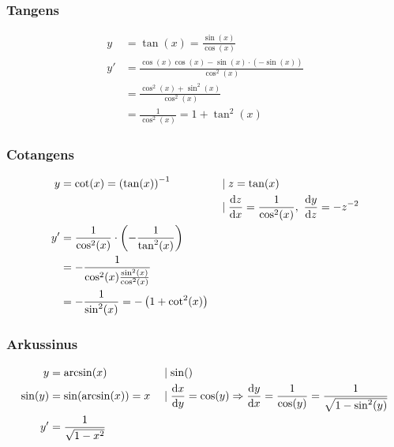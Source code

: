 \subsubsection{Tangens}

\begin{align*}
	y  & = \tan(x) = \frac{\sin(x)}{\cos(x)}                          \\
	y' & = \frac{\cos(x)\cos(x) - \sin(x)\cdot (-\sin(x))}{\cos^2(x)} \\
	   & = \frac{\cos^2(x) + \sin^2(x)}{\cos^2(x)}                    \\
	   & = \frac{1}{\cos^2(x)} = 1 + \tan^2(x)
\end{align*}

\subsubsection{Cotangens}

\begin{align*}
	y  & = \cot(x) = {(\tan(x))}^{-1}                                    &  & \mid z = \tan(x)                                                                       \\
	   &                                                                 &  & \mid \frac{\mathop{}\!\mathrm{d} z}{\mathop{}\!\mathrm{d} x} = \frac{1}{\cos^2(x)},\ \frac{\mathop{}\!\mathrm{d} y}{\mathop{}\!\mathrm{d} z} = -z^{-2} \\
	y' & = \frac{1}{\cos^2(x)} \cdot \left( -\frac{1}{\tan^2(x)} \right)                                                                                             \\
	   & = -\frac{1}{\cos^2(x) \frac{\sin^2(x)}{\cos^2(x)}}                                                                                                          \\
	   & = -\frac{1}{\sin^2(x)} = -\left( 1 + \cot^2(x) \right)
\end{align*}

\subsubsection{Arkussinus}

\begin{align*}
	y       & = \arcsin(x)               &  & \mid \sin()                                                                                                                     \\
	\sin(y) & = \sin(\arcsin(x)) = x     &  & \mid \frac{\mathop{}\!\mathrm{d} x}{\mathop{}\!\mathrm{d} y} = \cos(y) \Rightarrow \frac{\mathop{}\!\mathrm{d} y}{\mathop{}\!\mathrm{d} x} = \frac{1}{\cos(y)} = \frac{1}{\sqrt{1 - \sin^2(y)}} \\
	y'      & = \frac{1}{\sqrt{1 - x^2}}
\end{align*}

